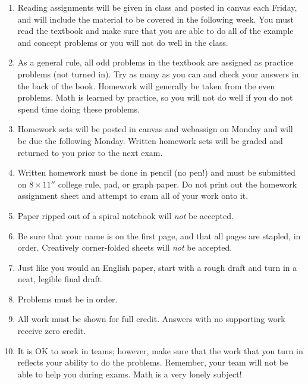 \documentclass[letterpaper,12pt,fleqn]{article}
\begin{document}

\vspace{0.5in}

\begin{enumerate}

\item Reading assignments will be given in class and posted in canvas each
    Friday, and will include the material to be covered in the following week.
    You must read the textbook and make sure that you are able to do all of the
    example and concept problems or you will not do well in the class.

\item As a general rule, all odd problems in the textbook are assigned as
    practice problems (not turned in). Try as many as you can and check your
    answers in the back of the book. Homework will generally be taken from the
    even problems. Math is learned by practice, so you will not do well if you
    do not spend time doing these problems.

\item Homework sets will be posted in canvas and webassign on Monday and will
    be due the following Monday. Written homework sets will be graded and
    returned to you prior to the next exam.

\item Written homework must be done in pencil (no pen!) and must be submitted
    on $8\times11''$ college rule, pad, or graph paper. Do not print out the
    homework assignment sheet and attempt to cram all of your work onto it.

\item Paper ripped out of a spiral notebook will \emph{not} be accepted.

\item Be sure that your name is on the first page, and that all pages are
    stapled, in order. Creatively corner-folded sheets will \emph{not} be
    accepted.

\item Just like you would an English paper, start with a rough draft and turn
    in a neat, legible final draft.

\item Problems must be in order.

\item All work must be shown for full credit. Answers with no supporting work
    receive zero credit.

\item It is OK to work in teams; however, make sure that the work that you turn
    in reflects your ability to do the problems. Remember, your team will not
    be able to help you during exams. Math is a very lonely subject!


\end{enumerate}
\end{document}
